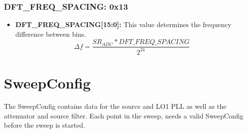 \documentclass{article}
\newcommand{\bitrect}[2]{
  \begin{pgfonlayer}{foreground}
    \draw [thick] (0,0) rectangle (#1,1);
    \pgfmathsetmacro\result{#1-1}
    \foreach \x in {1,...,\result}
      \draw [thick] (\x,1) -- (\x, 0.8);
  \end{pgfonlayer}
  \bitlabels{#1}{#2}
}
\newcommand{\rwbits}[3]{
  \draw [thick] (#1,0) rectangle ++(#2,1) node[pos=0.5]{#3};
  \pgfmathsetmacro\start{#1+0.5}
  \pgfmathsetmacro\finish{#1+#2-0.5}
}
\newcommand{\bitlabels}[2]{
  \foreach \bit in {1,...,#1}{
     \pgfmathsetmacro\result{#2}
     \node [above] at (\bit-0.5, 1) {\pgfmathprintnumber{\result}};
   }
}
\begin{document}
\subsubsection{DFT\_FREQ\_SPACING: 0x13}
\begin{center}
\end{center}
\begin{itemize}
\item \textbf{DFT\_FREQ\_SPACING[15:0]:} This value determines the frequency difference between bins.
$$ \Delta f =  \frac{SR_{ADC} * DFT\_FREQ\_SPACING}{2^{24}}$$
\end{itemize}

\section{SweepConfig}
\label{sweepconfig}
The SweepConfig contains data for the source and LO1 PLL as well as the attenuator and source filter. Each point in the sweep, needs a valid SweepConfig before the sweep is started.
\end{document}
